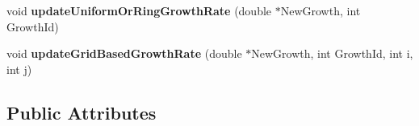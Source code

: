\begin{DoxyCompactItemize}
\item 
\hypertarget{classShapeBase_a62f7b57ae77a98a009ba2c5cd520fa71}{}void {\bfseries update\+Uniform\+Or\+Ring\+Growth\+Rate} (double $\ast$New\+Growth, int Growth\+Id)\label{classShapeBase_a62f7b57ae77a98a009ba2c5cd520fa71}

\item 
\hypertarget{classShapeBase_aff32f6cd08aba5c167297852b72e40b0}{}void {\bfseries update\+Grid\+Based\+Growth\+Rate} (double $\ast$New\+Growth, int Growth\+Id, int i, int j)\label{classShapeBase_aff32f6cd08aba5c167297852b72e40b0}

\end{DoxyCompactItemize}
\subsection*{Public Attributes}
